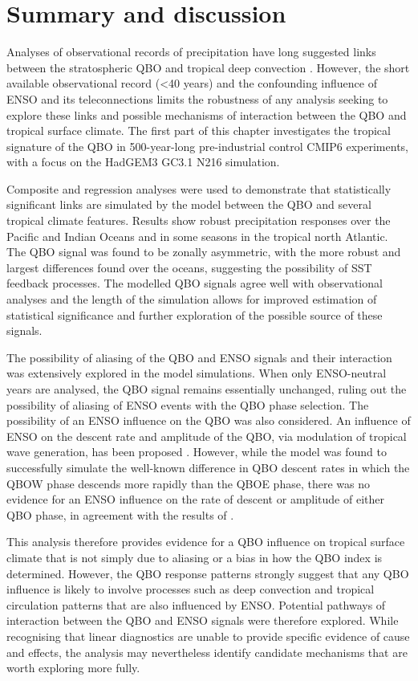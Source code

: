 \section{Summary and discussion}

Analyses of observational records of precipitation have long suggested links between the stratospheric QBO and tropical deep convection \citep{collimore2003,liess2012,gray2018}.
However, the short available observational record (<40 years) and the confounding influence of ENSO and its teleconnections limits the robustness of any analysis seeking to explore these links and possible mechanisms of interaction between the QBO and tropical surface climate. The first part of this chapter investigates the tropical signature of the QBO in 500-year-long pre-industrial control CMIP6 experiments, with a focus on the HadGEM3 GC3.1 N216 simulation. 

Composite and regression analyses were used to demonstrate that statistically significant links are simulated by the model between the QBO and several tropical climate features.
Results show robust precipitation responses over the Pacific and Indian Oceans and in some seasons in the tropical north Atlantic. The QBO signal was found to be zonally asymmetric, with the more robust and largest differences found over the oceans, suggesting the possibility of SST feedback processes. The modelled QBO signals agree well with observational analyses and the length of the simulation allows for improved estimation of statistical significance and further exploration of the possible source of these signals.   

The possibility of aliasing of the QBO and ENSO signals and their interaction was extensively explored in the model simulations. When only ENSO-neutral years are analysed, the QBO signal remains essentially unchanged, ruling out the possibility of aliasing of ENSO events with the QBO phase selection. The possibility of an ENSO influence on the QBO was also considered. An influence of ENSO on the descent rate and amplitude of the QBO, via modulation of tropical wave generation, has been proposed \citep{schirber2015,christiansen2016}. However, while the model was found to successfully simulate the well-known difference in QBO descent rates in which the QBOW phase descends more rapidly than the QBOE phase, there was no evidence for an ENSO influence on the rate of descent or amplitude of either QBO phase, in agreement with the results of \cite{serva2020}.      

This analysis therefore provides evidence for a QBO influence on tropical surface climate that is not simply due to aliasing or a bias in how the QBO index is determined. However, the QBO response patterns strongly suggest that any QBO influence is likely to involve processes such as deep convection and tropical circulation patterns that are also influenced by ENSO. Potential pathways of interaction between the QBO and ENSO signals were therefore explored. While recognising that linear diagnostics are unable to provide specific evidence of cause and effects, the analysis  may nevertheless identify candidate mechanisms that are worth exploring more fully.  


